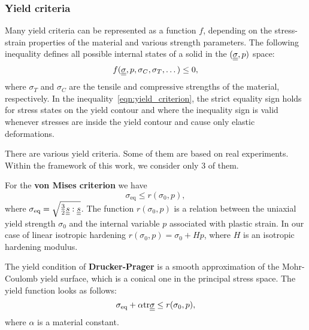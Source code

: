 \documentclass[12pt]{article}
\begin{document}


\subsubsection{Yield criteria}

Many yield criteria can be represented as a function $f$, depending on the stress-strain properties of the material and various strength parameters. The following inequality defines all possible internal states of a solid in the $(\underline{\underline{\sigma}}, p)$ space:
\begin{equation}\label{eqn:yield_criterion}
    f(\underline{\underline{\sigma}}, p, \sigma_C, \sigma_T, \dots) \leq 0,
\end{equation}
where $\sigma_T$ and $\sigma_C$ are the tensile and compressive strengths of the material, respectively. In the inequality~\eqref{eqn:yield_criterion}, the strict equality sign holds for stress states on the yield contour and where the inequality sign is valid whenever stresses are inside the yield contour and cause only elastic deformations.

There are various yield criteria. Some of them are based on real experiments. Within the framework of this work, we consider only 3 of them. 

For the \textbf{von Mises criterion} we have
\begin{equation*}
    \sigma_\text{eq} \leq r(\sigma_0, p),
\end{equation*}
where $\sigma_\text{eq} = \sqrt{\frac{3}{2}\underline{\underline{s}} : \underline{\underline{s}}}$. The function $r(\sigma_0, p)$ is a relation between the uniaxial yield strength $\sigma_0$ and the internal variable $p$ associated with plastic strain. In our case of linear isotropic hardening $r(\sigma_0, p) = \sigma_0 + Hp$, where $H$ is an isotropic hardening modulus.

The yield condition of \textbf{Drucker-Prager} is a smooth approximation of the Mohr-Coulomb yield surface, which is a conical one in the principal stress space. The yield function looks as follows:
\begin{equation*}
    \sigma_\text{eq} + \alpha\mathrm{tr}\underline{\underline{\sigma}} \leq r(\sigma_0, p),
\end{equation*}
where $\alpha$ is a material constant.
\end{document}
